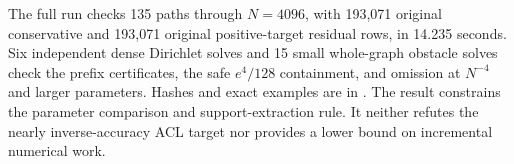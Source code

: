 The full run checks 135 paths through $N=4096$, with 193,071 original
conservative and 193,071 original positive-target residual rows, in
14.235 seconds. Six independent dense Dirichlet solves and 15 small
whole-graph obstacle solves check the prefix certificates, the safe
$e^4/128$ containment, and omission at $N^{-4}$ and larger parameters.
Hashes and exact examples are in
.
The result constrains the parameter comparison and support-extraction
rule. It neither refutes the nearly inverse-accuracy ACL target nor
provides a lower bound on incremental numerical work.

